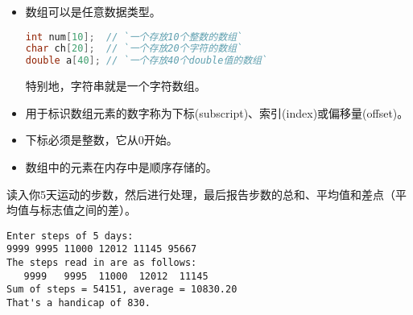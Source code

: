 \begin{frame}[fragile]\ft{\secname}
\begin{itemize}
\item
数组可以是任意数据类型。
\begin{lstlisting}[language=c,backgroundcolor=\color{red!10}]
int num[10];  // `一个存放10个整数的数组`
char ch[20];  // `一个存放20个字符的数组`
double a[40]; // `一个存放40个double值的数组`
\end{lstlisting}
特别地，字符串就是一个字符数组。
\end{itemize}
\end{frame}

\begin{frame}[fragile]\ft{\secname}
\begin{itemize}
\item
用于标识数组元素的数字称为下标(subscript)、索引(index)或偏移量(offset)。
\\[0.1in]
\item 下标必须是整数，它从0开始。\\[0.1in]
\item 数组中的元素在内存中是顺序存储的。
\end{itemize}
\end{frame}

\begin{frame}[fragile]
\begin{li}
读入你5天运动的步数，然后进行处理，最后报告步数的总和、平均值和差点（平均值与标志值之间的差）。
\end{li}
\end{frame}


\begin{frame}\ft{\secname}

\end{frame}


\begin{frame}[fragile]\ft{\secname}
  \begin{lstlisting}
Enter steps of 5 days:
9999 9995 11000 12012 11145 95667
The steps read in are as follows:
   9999   9995  11000  12012  11145
Sum of steps = 54151, average = 10830.20
That's a handicap of 830.
\end{lstlisting}
\end{frame}
 
